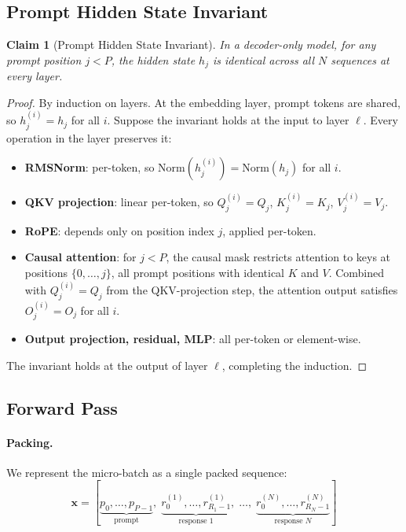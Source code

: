 \documentclass{article}
\newtheorem{claim}{Claim}
\begin{document}
\subsection{Prompt Hidden State Invariant}
\label{app:prompt-invariant}

\begin{claim}[Prompt Hidden State Invariant]
In a decoder-only model, for any prompt position $j < P$, the hidden state $h_j$ is identical across all $N$ sequences at every layer.
\end{claim}

\begin{proof}
By induction on layers. At the embedding layer, prompt tokens are shared, so $h_j^{(i)} = h_j$ for all $i$. Suppose the invariant holds at the input to layer $\ell$. Every operation in the layer preserves it:
\begin{itemize}
  \item \textbf{RMSNorm}: per-token, so $\text{Norm}(h_j^{(i)}) = \text{Norm}(h_j)$ for all $i$.
  \item \textbf{QKV projection}: linear per-token, so $Q_j^{(i)} = Q_j$, $K_j^{(i)} = K_j$, $V_j^{(i)} = V_j$.
  \item \textbf{RoPE}: depends only on position index $j$, applied per-token.
  \item \textbf{Causal attention}: for $j < P$, the causal mask restricts attention to keys at positions $\{0, \ldots, j\}$, all prompt positions with identical $K$ and $V$. Combined with $Q_j^{(i)} = Q_j$ from the QKV-projection step, the attention output satisfies $O_j^{(i)} = O_j$ for all $i$.
  \item \textbf{Output projection, residual, MLP}: all per-token or element-wise.
\end{itemize}
The invariant holds at the output of layer $\ell$, completing the induction.
\end{proof}

\subsection{Forward Pass}

\paragraph{Packing.} We represent the micro-batch as a single packed sequence:
\begin{equation}
  \mathbf{x} = [\underbrace{p_0, \ldots, p_{P-1}}_{\text{prompt}},\; \underbrace{r_0^{(1)}, \ldots, r_{R_1-1}^{(1)}}_{\text{response 1}},\; \ldots,\; \underbrace{r_0^{(N)}, \ldots, r_{R_N-1}^{(N)}}_{\text{response } N}]
\end{equation}
\end{document}
